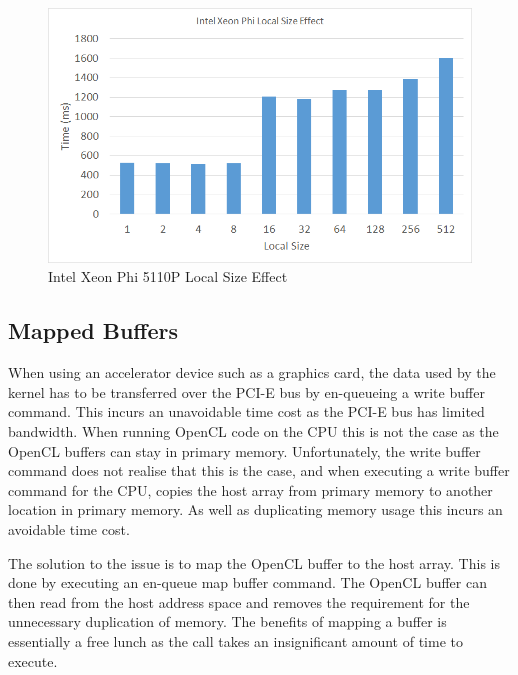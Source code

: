 \begin{figure}[H]
\includegraphics[width=\linewidth]{images/phiLocalSize.png}
\caption{Intel Xeon Phi 5110P Local Size Effect}
\label{fig:phiLocalSize}
\end{figure}

\subsection{Mapped Buffers}

When using an accelerator device such as a graphics card, the data used by the
kernel has to be transferred over the PCI-E bus by en-queueing a write buffer
command. This incurs an unavoidable time cost as the PCI-E bus has limited
bandwidth. When running OpenCL code on the CPU this is not the case as the
OpenCL buffers can stay in primary memory. Unfortunately, the write buffer
command does not realise that this is the case, and when executing a write
buffer command for the CPU, copies the host array from primary memory to another
location in primary memory. As well as duplicating memory usage this incurs an
avoidable time cost.

The solution to the issue is to map the OpenCL buffer to the host array. This is
done by executing an en-queue map buffer command. The OpenCL buffer can then
read from the host address space and removes the requirement for the unnecessary
duplication of memory. The benefits of mapping a buffer is essentially a free
lunch as the call takes an insignificant amount of time to execute.
